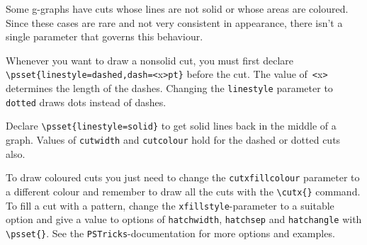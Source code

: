 \documentclass[a4paper,justified]{tufte-handout}
\newcommand{\greek}[1]{{\selectlanguage{polutonikogreek}#1\selectlanguage{english}}}
\begin{document}
Some\label{handyps} \greek{g}-graphs have cuts whose lines are not solid or whose areas are coloured. Since these cases are rare and not very consistent in appearance, there isn't a single parameter that governs this behaviour.

Whenever you want to draw a nonsolid cut, you must first declare \verb|\psset{linestyle=dashed,dash=<|{\Fontauri x}\verb|>pt}| before the cut. The value of~\verb|<|{\Fontauri x}\verb|>| determines the length of the dashes. Changing the \verb|linestyle| parameter to \verb|dotted| draws dots instead of dashes.

Declare \verb|\psset{linestyle=solid}| to get solid lines back in the middle of a graph. Values of \verb|cutwidth| and \verb|cutcolour| hold for the dashed or dotted cuts also.

To draw coloured cuts you just need to change the \texttt{cutxfillcolour}\label{gammacolouring} parameter to a different colour and remember to draw all the cuts with the \verb|\cutx{}| command. %
To fill a cut with a pattern, change the \texttt{xfillstyle}-parameter to a suitable option and give a value to options of \texttt{hatchwidth}, \texttt{hatchsep} and \texttt{hatchangle} with \verb|\psset{}|. See the \texttt{PSTricks}-documentation for more options and examples.
\end{document}
